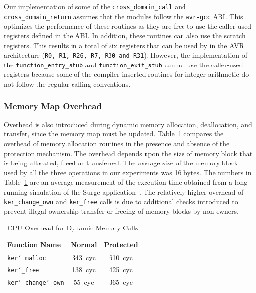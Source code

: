 Our implementation of some of the \texttt{cross\_domain\_call} and
\texttt{cross\_domain\_return} assumes that the modules follow the
\texttt{avr-gcc} ABI.
%
This optimizes the performance of these routines as they are free to use
the caller used registers defined in the ABI.
%
In addition, these routines can also use the scratch registers.
%
This results in a total of six registers that can be used by in the
AVR architecture (\texttt{R0, R1, R26, R7, R30 and R31}).
%
However, the implementation of the \texttt{function\_entry\_stub} and
\texttt{function\_exit\_stub} cannot use the caller-used registers
because some of the compiler inserted routines for integer arithmetic
do not follow the regular calling conventions.
\subsubsection{Memory Map Overhead}
%
Overhead is also introduced during dynamic memory allocation, deallocation,
and transfer, since the memory map must be updated.
%
Table~\ref{tab:malloc_comparison} compares the overhead of memory
allocation routines in the presence and absence of the protection
mechanism.
%
The overhead depends upon the size of memory block that is being
allocated, freed or transferred.
%
The average size of the memory block used by all the three operations in
our experiments was 16 bytes.
%
The numbers in Table~\ref{tab:malloc_comparison} are an average
measurement of the execution time obtained from a long running
simulation of the Surge application~\cite{woo03surge}.
%
The relatively higher overhead of \verb+ker_change_own+ and \verb+ker_free+
calls is due to additional checks introduced to prevent illegal
ownership transfer or freeing of memory blocks by non-owners.
%
\begin{table}[htdp]
\centering
\small{
\begin{tabular}{|l|c|c|}
	\hline
	Function Name & Normal & Protected \\
	\hline
	\texttt{ker\char`\_malloc}  & 343~cyc & 610~cyc \\
	\texttt{ker\char`\_free} & 138~cyc & 425~cyc\\
	\texttt{ker\char`\_change\char`\_own} & \hphantom{0}55~cyc & 365~cyc \\
	\hline
\end{tabular}}
\caption{CPU Overhead for Dynamic Memory Calls}
\label{tab:malloc_comparison}
\end{table}
%

